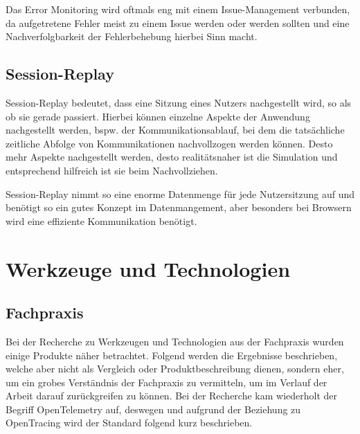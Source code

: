 Das Error Monitoring wird oftmals eng mit einem Issue-Management verbunden, da aufgetretene Fehler meist zu einem Issue werden oder werden sollten und eine Nachverfolgbarkeit der Fehlerbehebung hierbei Sinn macht.

\subsection{Session-Replay}

Session-Replay bedeutet, dass eine Sitzung eines Nutzers nachgestellt wird, so als ob sie gerade passiert. Hierbei können einzelne Aspekte der Anwendung nachgestellt werden, bspw. der Kommunikationsablauf, bei dem die tatsächliche zeitliche Abfolge von Kommunikationen nachvollzogen werden können. Desto mehr Aspekte nachgestellt werden, desto realitätsnaher ist die Simulation und entsprechend hilfreich ist sie beim Nachvollziehen.

Session-Replay nimmt so eine enorme Datenmenge für jede Nutzersitzung auf und benötigt so ein gutes Konzept im Datenmangement, aber besonders bei Browsern wird eine effiziente Kommunikation benötigt.

\newpage

\section{Werkzeuge und Technologien}
\label{sec:werkzeuge-und-technologien}

%
%

\subsection{Fachpraxis}

Bei der Recherche zu Werkzeugen und Technologien aus der Fachpraxis wurden einige Produkte näher betrachtet. Folgend werden die Ergebnisse beschrieben, welche aber nicht als Vergleich oder Produktbeschreibung dienen, sondern eher, um ein grobes Verständnis der Fachpraxis zu vermitteln, um im Verlauf der Arbeit darauf zurückgreifen zu können. Bei der Recherche kam wiederholt der Begriff OpenTelemetry auf, deswegen und aufgrund der Beziehung zu OpenTracing wird der Standard folgend kurz beschrieben.

